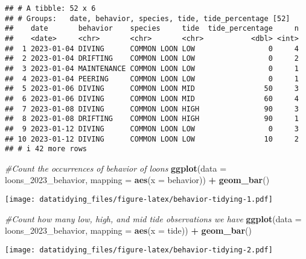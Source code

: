 \documentclass[
]{article}
\newenvironment{Shaded}{\begin{snugshade}}{\end{snugshade}}
\newcommand{\AttributeTok}[1]{\textcolor[rgb]{0.13,0.29,0.53}{#1}}
\newcommand{\CommentTok}[1]{\textcolor[rgb]{0.56,0.35,0.01}{\textit{#1}}}
\newcommand{\FunctionTok}[1]{\textcolor[rgb]{0.13,0.29,0.53}{\textbf{#1}}}
\newcommand{\NormalTok}[1]{#1}
\newcommand{\SpecialCharTok}[1]{\textcolor[rgb]{0.81,0.36,0.00}{\textbf{#1}}}
\begin{document}
\begin{verbatim}
## # A tibble: 52 x 6
## # Groups:   date, behavior, species, tide, tide_percentage [52]
##    date       behavior    species     tide  tide_percentage     n
##    <date>     <chr>       <chr>       <chr>           <dbl> <int>
##  1 2023-01-04 DIVING      COMMON LOON LOW                 0     4
##  2 2023-01-04 DRIFTING    COMMON LOON LOW                 0     2
##  3 2023-01-04 MAINTENANCE COMMON LOON LOW                 0     1
##  4 2023-01-04 PEERING     COMMON LOON LOW                 0     1
##  5 2023-01-06 DIVING      COMMON LOON MID                50     3
##  6 2023-01-06 DIVING      COMMON LOON MID                60     4
##  7 2023-01-08 DIVING      COMMON LOON HIGH               90     3
##  8 2023-01-08 DRIFTING    COMMON LOON HIGH               90     1
##  9 2023-01-12 DIVING      COMMON LOON LOW                 0     3
## 10 2023-01-12 DIVING      COMMON LOON LOW                10     2
## # i 42 more rows
\end{verbatim}

\begin{Shaded}
\begin{Highlighting}[]
\CommentTok{\#Count the occurrences of behavior of loons}
\FunctionTok{ggplot}\NormalTok{(}\AttributeTok{data =}\NormalTok{ loons\_2023\_behavior, }\AttributeTok{mapping =} \FunctionTok{aes}\NormalTok{(}\AttributeTok{x =}\NormalTok{ behavior)) }\SpecialCharTok{+} 
  \FunctionTok{geom\_bar}\NormalTok{()}
\end{Highlighting}
\end{Shaded}

\texttt{[image: datatidying\_files/figure-latex/behavior-tidying-1.pdf]}

\begin{Shaded}
\begin{Highlighting}[]
\CommentTok{\#Count how many low, high, and mid tide observations we have}
\FunctionTok{ggplot}\NormalTok{(}\AttributeTok{data =}\NormalTok{ loons\_2023\_behavior, }\AttributeTok{mapping =} \FunctionTok{aes}\NormalTok{(}\AttributeTok{x =}\NormalTok{ tide)) }\SpecialCharTok{+} 
  \FunctionTok{geom\_bar}\NormalTok{()}
\end{Highlighting}
\end{Shaded}

\texttt{[image: datatidying\_files/figure-latex/behavior-tidying-2.pdf]}
\end{document}
